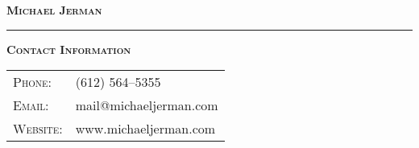 \documentclass[12pt]{article}
\begin{document}
\hspace*{\fill} \textbf{\textsc{\Large Michael Jerman}} \hspace*{\fill}



\bigskip

\hrule

\bigskip

\noindent \textsc{\large \textbf{Contact Information}}

\bigskip

\noindent\begin{minipage}[t]{.49\textwidth}
\begin{tabular}{ll}
    \textsc{Phone:} & (612) 564--5355 \\
    \textsc{Email:} & mail@michaeljerman.com \\
    \textsc{Website:} & www.michaeljerman.com 
\end{tabular}
\end{minipage}
\hspace*{\fill}





\end{document}
